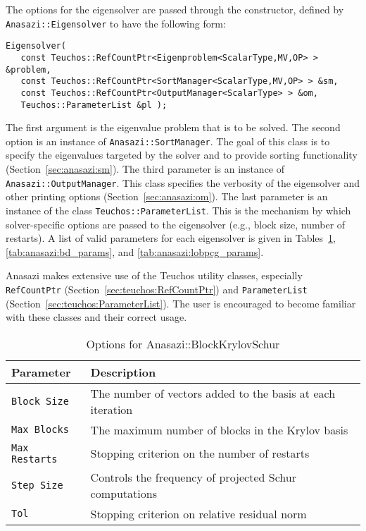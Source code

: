 The options for the eigensolver are passed through the constructor, defined by
\verb!Anasazi::Eigensolver! to have the following form:
\begin{verbatim}
Eigensolver( 
   const Teuchos::RefCountPtr<Eigenproblem<ScalarType,MV,OP> > &problem, 
   const Teuchos::RefCountPtr<SortManager<ScalarType,MV,OP> > &sm,
   const Teuchos::RefCountPtr<OutputManager<ScalarType> > &om,
   Teuchos::ParameterList &pl );
\end{verbatim}

The first argument is the eigenvalue problem that is to be solved. The second
option is an instance of \verb!Anasazi::SortManager!. The goal of this class is
to specify the eigenvalues targeted by the solver and to provide sorting
functionality (Section~\ref{sec:anasazi:sm}). The third parameter is an instance
of \verb!Anasazi::OutputManager!. This class specifies the verbosity of the
eigensolver and other printing options (Section~\ref{sec:anasazi:om}). The last
parameter is an instance of the class \verb!Teuchos::ParameterList!. This is the
mechanism by which solver-specific options are passed to the eigensolver (e.g.,
block size, number of restarts).  A list of valid parameters for each
eigensolver is given in Tables~\ref{tab:anasazi:bks_params},
\ref{tab:anasazi:bd_params}, and \ref{tab:anasazi:lobpcg_params}.

\begin{remark}
Anasazi makes extensive use of the Teuchos utility classes, especially
\verb!RefCountPtr! (Section~\ref{sec:teuchos:RefCountPtr}) and
\verb!ParameterList! (Section~\ref{sec:teuchos:ParameterList}). The
user is encouraged to become familiar with these classes and their correct
usage.
\end{remark}

\begin{table}
\begin{center}
\begin{tabular}{| p{4cm} l |}
\hline
Parameter & Description \\
\hline
{\tt Block Size}   & The number of vectors added to the basis at each iteration \\
{\tt Max Blocks}   & The maximum number of blocks in the Krylov basis \\
{\tt Max Restarts} & Stopping criterion on the number of restarts \\
{\tt Step Size}    & Controls the frequency of projected Schur computations \\
{\tt Tol}          & Stopping criterion on relative residual norm \\
\hline
\end{tabular}
\caption{Options for Anasazi::BlockKrylovSchur}
\label{tab:anasazi:bks_params}
\end{center}
\end{table}

